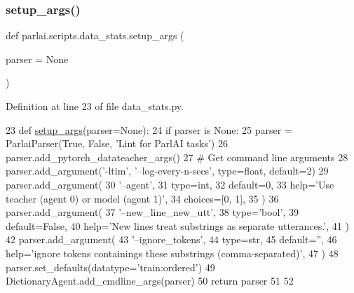 \subsubsection{\texorpdfstring{setup\+\_\+args()}{setup\_args()}}
{\footnotesize\ttfamily def parlai.\+scripts.\+data\+\_\+stats.\+setup\+\_\+args (\begin{DoxyParamCaption}\item[{}]{parser = {\ttfamily None} }\end{DoxyParamCaption})}



Definition at line 23 of file data\+\_\+stats.\+py.


\begin{DoxyCode}
23 \textcolor{keyword}{def }\hyperlink{namespaceparlai_1_1scripts_1_1data__stats_add47fb96d75895f4c21d9e310cb1df40}{setup\_args}(parser=None):
24     \textcolor{keywordflow}{if} parser \textcolor{keywordflow}{is} \textcolor{keywordtype}{None}:
25         parser = ParlaiParser(\textcolor{keyword}{True}, \textcolor{keyword}{False}, \textcolor{stringliteral}{'Lint for ParlAI tasks'})
26     parser.add\_pytorch\_datateacher\_args()
27     \textcolor{comment}{# Get command line arguments}
28     parser.add\_argument(\textcolor{stringliteral}{'-ltim'}, \textcolor{stringliteral}{'--log-every-n-secs'}, type=float, default=2)
29     parser.add\_argument(
30         \textcolor{stringliteral}{'--agent'},
31         type=int,
32         default=0,
33         help=\textcolor{stringliteral}{'Use teacher (agent 0) or model (agent 1)'},
34         choices=[0, 1],
35     )
36     parser.add\_argument(
37         \textcolor{stringliteral}{'--new\_line\_new\_utt'},
38         type=\textcolor{stringliteral}{'bool'},
39         default=\textcolor{keyword}{False},
40         help=\textcolor{stringliteral}{'New lines treat substrings as separate utterances.'},
41     )
42     parser.add\_argument(
43         \textcolor{stringliteral}{'--ignore\_tokens'},
44         type=str,
45         default=\textcolor{stringliteral}{''},
46         help=\textcolor{stringliteral}{'ignore tokens containings these substrings (comma-separated)'},
47     )
48     parser.set\_defaults(datatype=\textcolor{stringliteral}{'train:ordered'})
49     DictionaryAgent.add\_cmdline\_args(parser)
50     \textcolor{keywordflow}{return} parser
51 
52 
\end{DoxyCode}
\mbox{\label{namespaceparlai_1_1scripts_1_1data__stats_a3bf0a490abe0b6ea608d1f9ece194c79}} 
